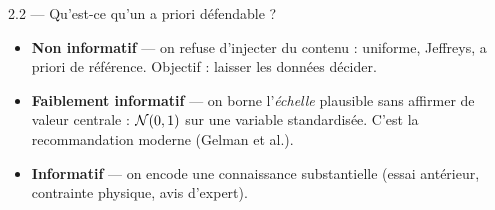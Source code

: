 
\begin{frame}{2.2 — Qu'est-ce qu'un a priori défendable ?}
\small
\begin{kbox}
\begin{itemize}
  \item \textbf{Non informatif} — on refuse d'injecter du contenu : uniforme, Jeffreys,
        a priori de référence. Objectif : laisser les données décider.
  \item \textbf{Faiblement informatif} — on borne l'\emph{échelle} plausible sans
        affirmer de valeur centrale : $\mathcal{N}(0,1)$ sur une variable standardisée.
        C'est la recommandation moderne (Gelman et al.).
  \item \textbf{Informatif} — on encode une connaissance substantielle
        (essai antérieur, contrainte physique, avis d'expert).
\end{itemize}
\end{kbox}
\vspace{1mm}
\end{frame}

